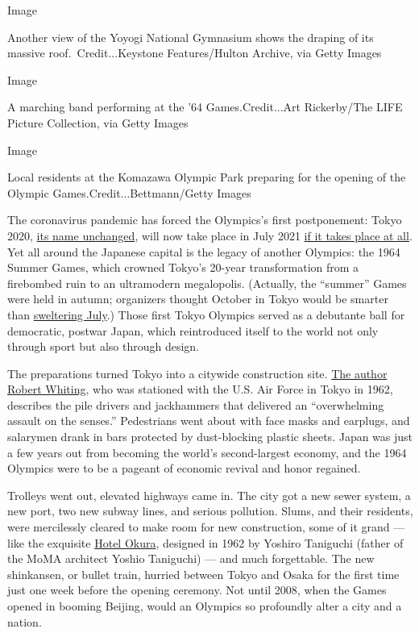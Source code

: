 Image

Another view of the Yoyogi National Gymnasium shows the draping of its
massive roof.~Credit...Keystone Features/Hulton Archive, via Getty
Images

Image

A marching band performing at the '64 Games.Credit...Art Rickerby/The
LIFE Picture Collection, via Getty Images

Image

Local residents at the Komazawa Olympic Park preparing for the opening
of the Olympic Games.Credit...Bettmann/Getty Images

The coronavirus pandemic has forced the Olympics's first postponement:
Tokyo 2020,
\href{https://www.nytimes.com/2020/03/25/world/asia/japan-olympics-delay.html}{its
name unchanged}, will now take place in July 2021
\href{https://www.nytimes.com/2020/07/19/sports/2021-tokyo-olympics-protocols.html}{if
it takes place at all}. Yet all around the Japanese capital is the
legacy of another Olympics: the 1964 Summer Games, which crowned Tokyo's
20-year transformation from a firebombed ruin to an ultramodern
megalopolis. (Actually, the ``summer'' Games were held in autumn;
organizers thought October in Tokyo would be smarter than
\href{https://www.nytimes.com/2019/10/10/sports/tokyo-braces-for-the-hottest-olympics-ever.html}{sweltering
July}.) Those first Tokyo Olympics served as a debutante ball for
democratic, postwar Japan, which reintroduced itself to the world not
only through sport but also through design.

The preparations turned Tokyo into a citywide construction site.
\href{https://www.japantimes.co.jp/sports/2014/10/10/olympics/olympic-construction-transformed-tokyo/}{The
author Robert Whiting}, who was stationed with the U.S. Air Force in
Tokyo in 1962, describes the pile drivers and jackhammers that delivered
an ``overwhelming assault on the senses.'' Pedestrians went about with
face masks and earplugs, and salarymen drank in bars protected by
dust-blocking plastic sheets. Japan was just a few years out from
becoming the world's second-largest economy, and the 1964 Olympics were
to be a pageant of economic revival and honor regained.

Trolleys went out, elevated highways came in. The city got a new sewer
system, a new port, two new subway lines, and serious pollution. Slums,
and their residents, were mercilessly cleared to make room for new
construction, some of it grand --- like the exquisite
\href{https://www.studionicholson.com/blogs/features/hotel-okura-tokyo\#:~:text=The\%20Okura\%20was\%20built\%20in,back\%20modernism\%20of\%20the\%20time.}{Hotel
Okura}, designed in 1962 by Yoshiro Taniguchi (father of the MoMA
architect Yoshio Taniguchi) --- and much forgettable. The new
shinkansen, or bullet train, hurried between Tokyo and Osaka for the
first time just one week before the opening ceremony. Not until 2008,
when the Games opened in booming Beijing, would an Olympics so
profoundly alter a city and a nation.

